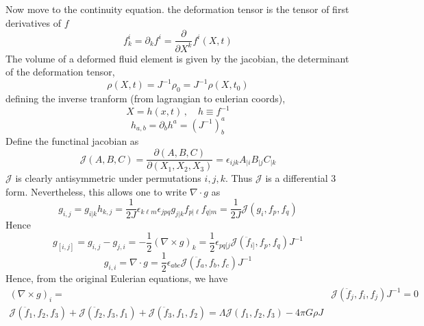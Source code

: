Now move to the continuity equation. the deformation tensor is the tensor of first derivatives of $f$
\begin{equation}
	f^i_k = \partial_kf^i = \frac{\partial}{\partial X^k} f^i(X,t)
\end{equation}
The volume of a deformed fluid element is given by the jacobian, the determinant of the deformation tensor,
\begin{equation}
	\rho(X,t) = J^{-1} \rho_0 = J^{-1} \rho(X,t_0)
\end{equation}
defining the inverse tranform (from lagrangian to eulerian coords),
\begin{equation}
	X = h(x,t)\,,\quad h\equiv f^{-1}
\end{equation}
\begin{equation}
	h_{a,b} = \partial_b h^a = (J^{-1})^a_b
\end{equation}
Define the functinal jacobian as
\begin{equation}
	\mathcal{J}(A,B,C) = \frac{\partial(A,B,C)}{\partial(X_1,X_2,X_3)} = \epsilon_{ijk}A_{|i}B_{|j}C_{|k}
\end{equation}
$\mathcal{J}$ is clearly antisymmetric under permutations $i,j,k$. Thus $\mathcal{J}$ is a differential 3 form. Nevertheless, this allows one to write $\nabla\cdot g$ as
\begin{equation}
	g_{i,j} = g_{i|k}h_{k,j} = \frac{1}{2J}\epsilon_{k\ell m}\epsilon_{jpq} g_{j|k}f_{p|\ell}f_{q|m} = \frac{1}{2J}\mathcal{J}(g_i,f_p,f_q)
\end{equation}
Hence
\begin{equation}
	g_{[i,j]} = g_{i,j} - g_{j,i} = -\frac{1}{2}(\nabla\times g)_k = \frac{1}{2}\epsilon_{pq[j}\mathcal{J}(\ddot f_{i]},f_p,f_q)J^{-1}
\end{equation}
\begin{equation}
	g_{i,i} = \nabla\cdot g = \frac{1}{2}\epsilon_{abc}\mathcal{J}(\ddot f_a,f_b,f_c)J^{-1}
\end{equation}
Hence, from the original Eulerian equations, we have
\begin{equation}
	\begin{split}
		(\nabla\times g)_i =& \mathcal{J}(\ddot{f}_j,f_i,f_j)J^{-1} = 0 \\
		\mathcal{J}(\ddot{f}_1,f_2,f_3) + \mathcal{J}(\ddot{f}_2,f_3,f_1) + \mathcal{J}(\ddot{f}_3,f_1,f_2) = \Lambda\mathcal{J}(f_1,f_2,f_3) - 4\pi G \rho J
	\end{split}
\end{equation}
